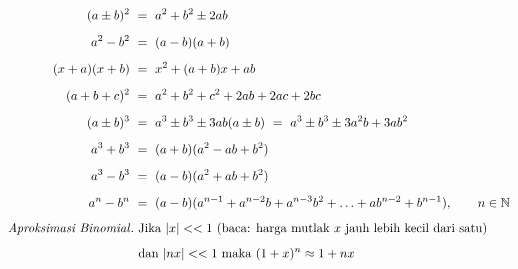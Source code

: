 \documentclass[12pt, a4paper]{article}\usepackage[utf8]{inputenc}
\theoremstyle{plain}
\theoremstyle{plain}
\numberwithin{equation}{section}
\theoremstyle{definition}
\begin{document}
	\vspace{-2em}
	
	\begin{align*}
		(a \pm b)^2 \ &= \ a^2 + b^2 \pm 2ab \\[.5em]
		a^2 - b^2 \ &= \ (a - b)(a + b)\\[.5em]
		(x + a)(x + b) \ &= \ x^2 + (a+b)x + ab\\[.5em]
		(a + b + c)^2 \ &= \ a^2 + b^2 + c^2 + 2ab + 2ac + 2bc\\[.5em]
		(a \pm b)^3 \ &= \ a^3 \pm b^3 \pm 3ab(a \pm b) \ = \ a^3 \pm b^3 \pm 3a^2b + 3ab^2 \\[.5em]
		a^3 + b^3 \ &= \ (a + b)(a^2 - ab + b^2)\\[.5em]
		a^3 - b^3 \ &= \ (a - b)(a^2 + ab + b^2)\\[.5em]
		a^n - b^n \ &= \ (a - b)(a^{n-1} + a^{n-2} b + a^{n-3}b^2 + \ldots + ab^{n-2} + b^{n-1}), \qquad n \in \mathbb{N} \\[.5em]
		\text{\emph{Aproksimasi Binomial}}. & \text{ Jika $ |x| << 1$ (baca: harga mutlak $x$ jauh lebih kecil dari satu)}\\[.5em] & \text{ dan $|nx| << 1$ maka } (1 + x)^n \approx 1 + nx
	\end{align*}
	
	
	
\end{document}
